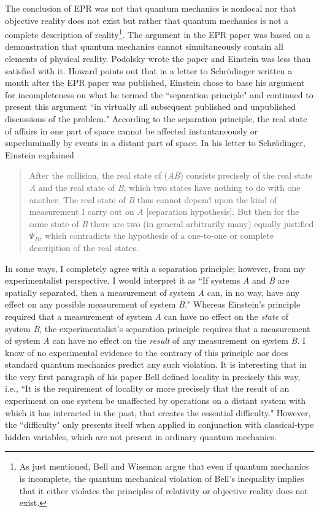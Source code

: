 \documentclass[12pt]{article}
\begin{document}
The conclusion of EPR was not that quantum mechanics is nonlocal nor that objective reality does not exist but rather that quantum mechanics is not a complete description of reality\footnote{ As just mentioned, Bell and Wiseman argue that even if quantum mechanics is incomplete, the quantum mechanical violation of Bell's inequality implies that it either violates the principles of relativity or objective reality does not exist.}. The argument in the EPR paper was based on a demonstration that quantum mechanics cannot simultaneously contain all elements of physical reality. Podolsky wrote the paper and Einstein was less than satisfied with it. Howard\cite{How07} points out that in a letter to Schr\"{o}dinger written a month after the EPR paper was published, Einstein chose to base his argument for incompleteness on what he termed the ``separation principle" and continued to present this argument ``in virtually all subsequent published and
unpublished discussions of the problem."\cite{How07}  According to the separation principle, the real state of affairs in one part of space cannot be affected instantaneously or superluminally by events in a distant part of space. In his letter to Schr\"{o}dinger, Einstein explained\cite{How07}
\begin{quote}
After the collision, the real state of ({\it AB}) consists precisely of the real state {\it A} and the real state of {\it B}, which two states have nothing to do with one another. The real state of {\it B} thus cannot depend upon the kind of measurement I carry out on {\it A} [separation hypothesis]. But then for the same state of {\it B} there are two (in general arbitrarily many) equally justified $\Psi_B$, which contradicts the hypothesis of a one-to-one or complete description of the real states.
\end{quote}

In some ways, I completely agree with a separation principle; however, from my experimentalist perspective, I would interpret it as ``If systems {\it A} and {\it B} are spatially separated, then a measurement of system {\it A} can, in no way, have any effect on any possible measurement of system {\it B}." Whereas Einstein's principle required that a measurement of system {\it A} can have no effect on the {\it state} of system {\it B}, the experimentalist's separation principle requires that a measurement of system {\it A} can have no effect on the {\it result} of any measurement on system {\it B}.  I know of no experimental evidence to the contrary of this principle nor does standard quantum mechanics predict any such violation. It is interesting that in the very first paragraph of his paper Bell defined locality in precisely this way, i.e., ``It is the requirement of locality or more precisely that the result of an experiment on one system be unaffected by operations on a distant system with which it has interacted in the past, that creates the essential difficulty."\cite{Bel64} However, the ``difficulty" only presents itself when applied in conjunction with classical-type hidden variables, which are not present in ordinary quantum mechanics.
\end{document}
